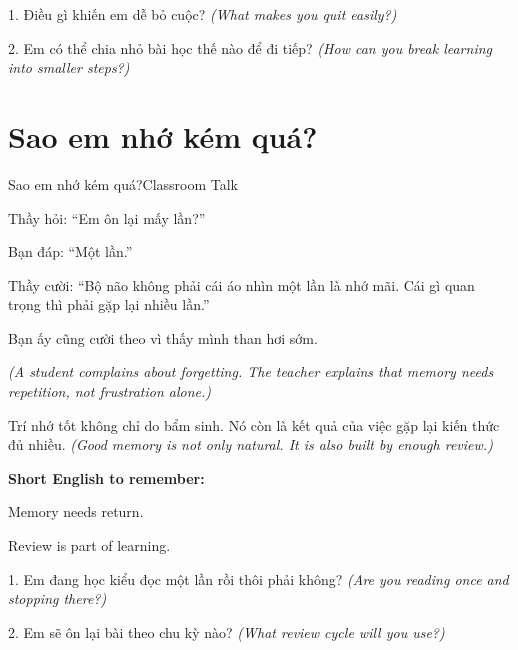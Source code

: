 \begin{tuhocnhanh}
1. Điều gì khiến em dễ bỏ cuộc? \textit{(What makes you quit easily?)}

2. Em có thể chia nhỏ bài học thế nào để đi tiếp? \textit{(How can you break learning into smaller steps?)}
\end{tuhocnhanh}
\ngancach

\section{Sao em nhớ kém quá?}
\begin{truyen}{Sao em nhớ kém quá?}{Classroom Talk}

Thầy hỏi: ``Em ôn lại mấy lần?''

Bạn đáp: ``Một lần.''

Thầy cười: ``Bộ não không phải cái áo nhìn một lần là nhớ mãi. Cái gì quan trọng thì phải gặp lại nhiều lần.''

Bạn ấy cũng cười theo vì thấy mình than hơi sớm.

\textit{(A student complains about forgetting. The teacher explains that memory needs repetition, not frustration alone.)}
\end{truyen}

\begin{baihoc}
Trí nhớ tốt không chỉ do bẩm sinh. Nó còn là kết quả của việc gặp lại kiến thức đủ nhiều.
\textit{(Good memory is not only natural. It is also built by enough review.)}
\end{baihoc}

\begin{ghinhoanh}
\textbf{Short English to remember:}

Memory needs return.

Review is part of learning.
\end{ghinhoanh}

\begin{tuhocnhanh}
1. Em đang học kiểu đọc một lần rồi thôi phải không? \textit{(Are you reading once and stopping there?)}

2. Em sẽ ôn lại bài theo chu kỳ nào? \textit{(What review cycle will you use?)}
\end{tuhocnhanh}
\ngancach

